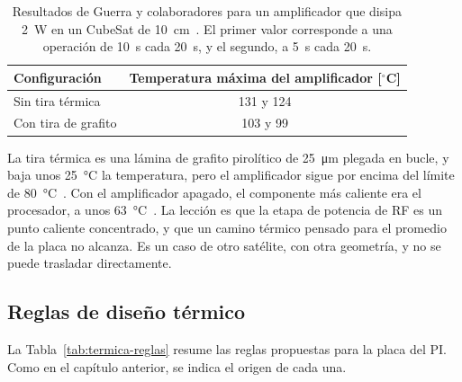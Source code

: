 \begin{table}[H]
  \centering
  \caption[Temperaturas de un amplificador de 2 W en un CubeSat.]{Resultados de Guerra y colaboradores para un amplificador que disipa \SI{2}{\watt} en un CubeSat de \SI{10}{\centi\metre}~\cite{guerra18}. El primer valor corresponde a una operación de \SI{10}{\second} cada \SI{20}{\second}, y el segundo, a \SI{5}{\second} cada \SI{20}{\second}.}\label{tab:termica-guerra}
  \begin{tabular}{@{}lc@{}}
    \toprule
    Configuración & Temperatura máxima del amplificador [$^\circ$C] \\
    \midrule
    Sin tira térmica         & 131 y 124 \\
    Con tira de grafito      & 103 y 99 \\
    \bottomrule
  \end{tabular}
\end{table}

La tira térmica es una lámina de grafito pirolítico de \SI{25}{\micro\metre} plegada en bucle, y baja unos \SI{25}{\celsius} la temperatura, pero el amplificador sigue por encima del límite de \SI{80}{\celsius}~\cite{guerra18}. Con el amplificador apagado, el componente más caliente era el procesador, a unos \SI{63}{\celsius}~\cite{guerra18}. La lección es que la etapa de potencia de RF es un punto caliente concentrado, y que un camino térmico pensado para el promedio de la placa no alcanza. Es un caso de otro satélite, con otra geometría, y no se puede trasladar directamente.

\subsection{Reglas de diseño térmico}\label{sec:termica-reglas}

La Tabla~\ref{tab:termica-reglas} resume las reglas propuestas para la placa del PI\@. Como en el capítulo anterior, se indica el origen de cada una.

